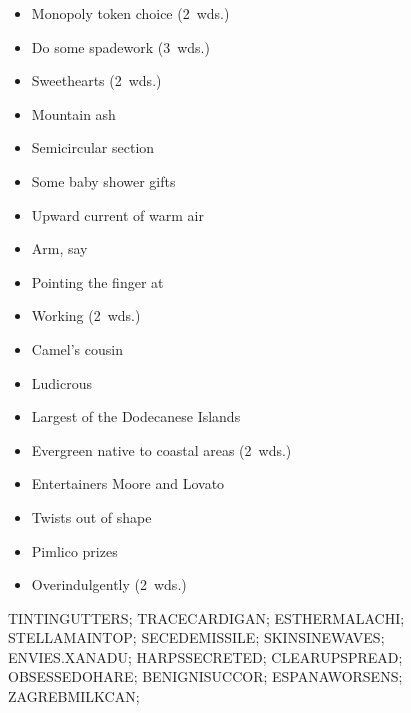 {\begin{itemize}
    \end{itemize}
  \item
    \begin{itemize}
      \item
        Monopoly token choice (2~wds.)
      \item
        Do some spadework (3~wds.)
      \item
        Sweethearts (2~wds.)
      \item
        Mountain ash
      \item
        Semicircular section
      \item
        Some baby shower gifts
    \end{itemize}
  \item
    \begin{itemize}
      \item
        Upward current of warm air
      \item
        Arm, say
      \item
        Pointing the finger at
      \item
        Working (2~wds.)
    \end{itemize}
  \item
    \begin{itemize}
      \item
        Camel's cousin
      \item
        Ludicrous
      \item
        Largest of the Dodecanese Islands
      \item
        Evergreen native to coastal areas (2~wds.)
    \end{itemize}
  \item
    \begin{itemize}
      \item
        Entertainers Moore and Lovato
      \item
        Twists out of shape
      \item
        Pimlico prizes
    \end{itemize}
  \item
    \begin{itemize}
      \item
        Overindulgently (2~wds.)
    \end{itemize}
}{%
  \puzzlerow TINTINGUTTERS;
  \puzzlerow TRACECARDIGAN;
  \puzzlerow ESTHERMALACHI;
  \puzzlerow STELLAMAINTOP;
  \puzzlerow SECEDEMISSILE;
  \puzzlerow SKINSINEWAVES;
  \puzzlerow ENVIES.XANADU;
  \puzzlerow HARPSSECRETED;
  \puzzlerow CLEARUPSPREAD;
  \puzzlerow OBSESSEDOHARE;
  \puzzlerow BENIGNISUCCOR;
  \puzzlerow ESPANAWORSENS;
  \puzzlerow ZAGREBMILKCAN;
}
